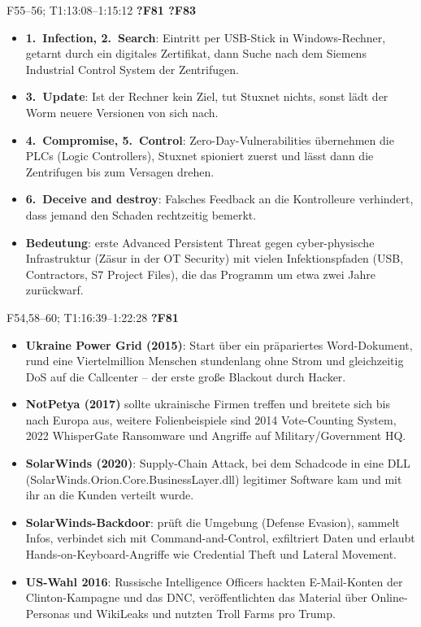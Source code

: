 \documentclass[10pt,a4paper]{article}
\newcommand{\block}[2]{\par\vspace{3pt}{\bfseries #1}\hfill{\scriptsize #2}\par\nopagebreak}
\begin{document}
\block{Stuxnet: wie es funktionierte}{F55--56; T1:13:08--1:15:12 \quad \textbf{?F81 ?F83}}
\begin{itemize}
\item \textbf{1.\ Infection, 2.\ Search}: Eintritt per USB-Stick in Windows-Rechner, getarnt durch ein digitales Zertifikat, dann Suche nach dem Siemens Industrial Control System der Zentrifugen.
\item \textbf{3.\ Update}: Ist der Rechner kein Ziel, tut Stuxnet nichts, sonst lädt der Worm neuere Versionen von sich nach.
\item \textbf{4.\ Compromise, 5.\ Control}: Zero-Day-Vulnerabilities übernehmen die PLCs (Logic Controllers), Stuxnet spioniert zuerst und lässt dann die Zentrifugen bis zum Versagen drehen.
\item \textbf{6.\ Deceive and destroy}: Falsches Feedback an die Kontrolleure verhindert, dass jemand den Schaden rechtzeitig bemerkt.
\item \textbf{Bedeutung}: erste Advanced Persistent Threat gegen cyber-physische Infrastruktur (Zäsur in der OT Security) mit vielen Infektionspfaden (USB, Contractors, S7 Project Files), die das Programm um etwa zwei Jahre zurückwarf.
\end{itemize}
\block{Russia: Ukraine, SolarWinds, US-Wahl 2016}{F54,58--60; T1:16:39--1:22:28 \quad \textbf{?F81}}
\begin{itemize}
\item \textbf{Ukraine Power Grid (2015)}: Start über ein präpariertes Word-Dokument, rund eine Viertelmillion Menschen stundenlang ohne Strom und gleichzeitig DoS auf die Callcenter -- der erste große Blackout durch Hacker.
\item \textbf{NotPetya (2017)} sollte ukrainische Firmen treffen und breitete sich bis nach Europa aus, weitere Folienbeispiele sind 2014 Vote-Counting System, 2022 WhisperGate Ransomware und Angriffe auf Military/Government HQ.
\item \textbf{SolarWinds (2020)}: Supply-Chain Attack, bei dem Schadcode in eine DLL (SolarWinds.Orion.Core.BusinessLayer.dll) legitimer Software kam und mit ihr an die Kunden verteilt wurde.
\item \textbf{SolarWinds-Backdoor}: prüft die Umgebung (Defense Evasion), sammelt Infos, verbindet sich mit Command-and-Control, exfiltriert Daten und erlaubt Hands-on-Keyboard-Angriffe wie Credential Theft und Lateral Movement.
\item \textbf{US-Wahl 2016}: Russische Intelligence Officers hackten E-Mail-Konten der Clinton-Kampagne und das DNC, veröffentlichten das Material über Online-Personas und WikiLeaks und nutzten Troll Farms pro Trump.
\end{itemize}
\end{document}
